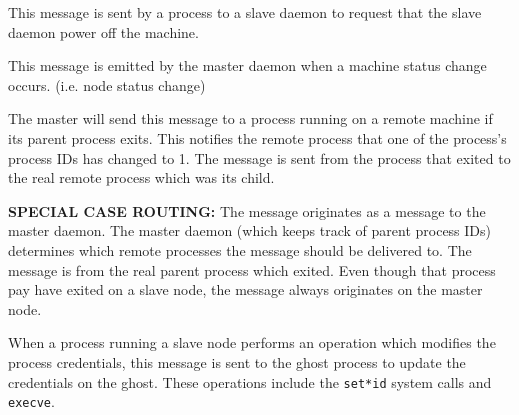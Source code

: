 \begin{description}
  \begin{reqresp}
  \response
  \end{reqresp}


  \begin{reqresp}
  \end{reqresp}

  This message is sent by a process to a slave daemon to request that
  the slave daemon power off the machine.






  This message is emitted by the master daemon when a machine status
  change occurs.  (i.e. node status change)

  \begin{reqresp}
  \noresponse
  \end{reqresp}


  The master will send this message to a process running on a remote
  machine if its parent process exits.  This notifies the remote
  process that one of the process's process IDs has changed to 1.  The
  message is sent from the process that exited to the real remote
  process which was its child.

  \textbf{SPECIAL CASE ROUTING:} The message originates as a message
  to the master daemon.  The master daemon (which keeps track of
  parent process IDs) determines which remote processes the message
  should be delivered to.  The message is from the real parent process
  which exited.  Even though that process pay have exited on a slave
  node, the message always originates on the master node.

  \begin{reqresp}
  \noresponse
  \end{reqresp}





  When a process running a slave node performs an operation which
  modifies the process credentials, this message is sent to the ghost
  process to update the credentials on the ghost.  These operations
  include the \texttt{set*id} system calls and \texttt{execve}.


\end{description}
